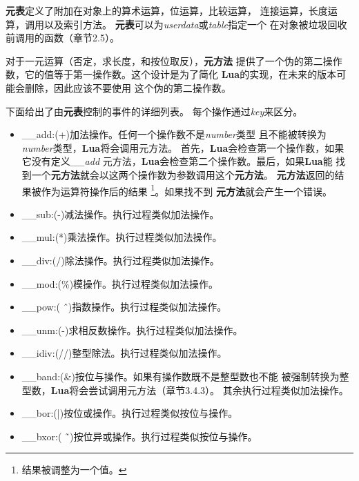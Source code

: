 \documentclass{ctexart}
\begin{document}
\textbf{元表}定义了附加在对象上的算术运算，位运算，比较运算，
连接运算，长度运算，调用以及索引方法。
\textbf{元表}可以为\emph{userdata}或\emph{table}指定一个
在对象被垃圾回收前调用的函数（章节2.5）。

对于一元运算（否定，求长度，和按位取反），\textbf{元方法}
提供了一个伪的第二操作数，它的值等于第一操作数。这个设计是为了简化
\textbf{Lua}的实现，在未来的版本可能会删除，因此应该不要使用
这个伪的第二操作数。

下面给出了由\textbf{元表}控制的事件的详细列表。
每个操作通过\emph{key}来区分。

\begin{itemize}
\item \_\_add:(+)加法操作。任何一个操作数不是\emph{number}类型
且不能被转换为\emph{number}类型，\textbf{Lua}将会调用元方法。
首先，\textbf{Lua}会检查第一个操作数，如果它没有定义\emph{\_\_add}
元方法，\textbf{Lua}会检查第二个操作数。最后，如果\textbf{Lua}能
找到一个\textbf{元方法}就会以这两个操作数为参数调用这个\textbf{元方法}。
\textbf{元方法}返回的结果被作为运算符操作后的结果
\footnote{结果被调整为一个值。}。如果找不到
\textbf{元方法}就会产生一个错误。

\item \_\_sub:(-)减法操作。执行过程类似加法操作。

\item \_\_mul:(*)乘法操作。执行过程类似加法操作。

\item \_\_div:(/)除法操作。执行过程类似加法操作。

\item \_\_mod:(\%)模操作。执行过程类似加法操作。

\item \_\_pow:( \^ \  )指数操作。执行过程类似加法操作。

\item \_\_unm:(-)求相反数操作。执行过程类似加法操作。

\item \_\_idiv:(//)整型除法。执行过程类似加法操作。

\item \_\_band:(\&)按位与操作。如果有操作数既不是整型数也不能
被强制转换为整型数，\textbf{Lua}将会尝试调用元方法（章节3.4.3）。
其余执行过程类似加法操作。

\item \_\_bor:(|)按位或操作。执行过程类似按位与操作。

\item \_\_bxor:( \~\ )按位异或操作。执行过程类似按位与操作。


\end{itemize}
\end{document}

